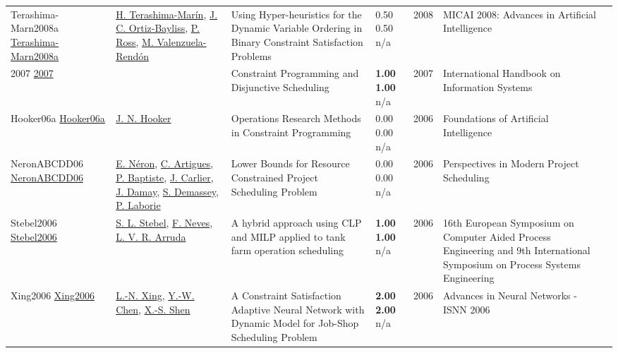 {\begin{longtable}{p{3cm}p{5cm}p{10cm}p{1cm}rp{2.5cm}l}
Terashima-Marn2008a \href{http://dx.doi.org/10.1007/978-3-540-88636-5_39}{Terashima-Marn2008a} & \hyperref[auth:a1608]{H. Terashima-Marín}, \hyperref[auth:a1603]{J. C. Ortiz-Bayliss}, \hyperref[auth:a1898]{P. Ross}, \hyperref[auth:a1899]{M. Valenzuela-Rendón} & Using Hyper-heuristics for the Dynamic Variable Ordering in Binary Constraint Satisfaction Problems & \noindent{}0.50 0.50 n/a & 2008 & MICAI 2008: Advances in Artificial Intelligence & \cite{Terashima-Marn2008a}\\
2007 \href{http://dx.doi.org/10.1007/978-3-540-32220-7_13}{2007} &  & Constraint Programming and Disjunctive Scheduling & \noindent{}\textbf{1.00} \textbf{1.00} n/a & 2007 & International Handbook on Information Systems & \cite{2007}\\
Hooker06a \href{http://dx.doi.org/10.1016/s1574-6526(06)80019-2}{Hooker06a} & \hyperref[auth:a160]{J. N. Hooker} & Operations Research Methods in Constraint Programming & \noindent{}\textcolor{black!50}{0.00} \textcolor{black!50}{0.00} n/a & 2006 & Foundations of Artificial Intelligence & \cite{Hooker06a}\\
NeronABCDD06 \href{http://dx.doi.org/10.1007/978-0-387-33768-5_7}{NeronABCDD06} & \hyperref[auth:a899]{E. Néron}, \hyperref[auth:a6]{C. Artigues}, \hyperref[auth:a162]{P. Baptiste}, \hyperref[auth:a845]{J. Carlier}, \hyperref[auth:a900]{J. Damay}, \hyperref[auth:a243]{S. Demassey}, \hyperref[auth:a118]{P. Laborie} & Lower Bounds for Resource Constrained Project Scheduling Problem & \noindent{}\textcolor{black!50}{0.00} \textcolor{black!50}{0.00} n/a & 2006 & Perspectives in Modern Project Scheduling & \cite{NeronABCDD06}\\
Stebel2006 \href{http://dx.doi.org/10.1016/s1570-7946(06)80377-9}{Stebel2006} & \hyperref[auth:a1865]{S. L. Stebel}, \hyperref[auth:a1866]{F. Neves}, \hyperref[auth:a1809]{L. V. R. Arruda} & A hybrid approach using CLP and MILP applied to tank farm operation scheduling & \noindent{}\textbf{1.00} \textbf{1.00} n/a & 2006 & 16th European Symposium on Computer Aided Process Engineering and 9th International Symposium on Process Systems Engineering & \cite{Stebel2006}\\
Xing2006 \href{http://dx.doi.org/10.1007/11760191_135}{Xing2006} & \hyperref[auth:a1986]{L.-N. Xing}, \hyperref[auth:a1987]{Y.-W. Chen}, \hyperref[auth:a1988]{X.-S. Shen} & A Constraint Satisfaction Adaptive Neural Network with Dynamic Model for Job-Shop Scheduling Problem & \noindent{}\textbf{2.00} \textbf{2.00} n/a & 2006 & Advances in Neural Networks - ISNN 2006 & \cite{Xing2006}\\

\end{longtable}}

